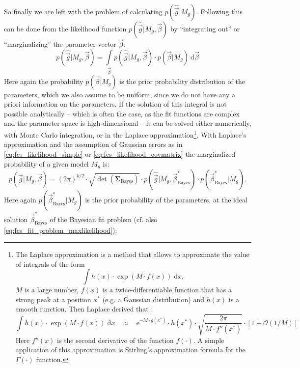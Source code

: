 \documentclass[a4paper,notitlepage]{article}
\newcommand{\mat}[1]{\mathrm{\mathbf{#1}}}
\begin{document}
So finally we are left with the problem of calculating $p(\hat{\vec{g}}|M_g)$. Following  \cite{HE2012} this can be done from the likelihood function $p(\hat{\vec{g}}|M_g,\vec{\beta})$ by ``integrating out'' or ``marginalizing'' the parameter vector $\vec{\beta}$:
\begin{equation}\label{eq:bayes_propfromlikelihood}
    p(\hat{\vec{g}}|M_g,\vec{\beta})=\int\limits_{\vec{\beta}} p(\hat{\vec{g}}|M_g,\vec{\beta})\cdot p(\vec{\beta}|M_g)\ \mathrm{d}\vec{\beta}
\end{equation}
Here again the probability $p(\vec{\beta}|M_g)$ is the prior probability distribution of the parameters, which we also assume to be uniform, since we do not have any a priori information on the parameters. If the solution of this integral is not possible analytically -- which is often the case, as the fit functions are complex and the parameter space is high-dimensional -- it can be solved either numerically, with Monte Carlo integration, or in the Laplace approximation\cite{KASS1995}\footnote{The Laplace approximation is a method that allows to approximate the value of integrals of the form \[\int h(x)\cdot \exp\left(M\cdot f(x)\right)\;\mathrm{d}x,\] $M$ is a large number, $f(x)$ is a twice-differentiable function that has a strong peak at a position $x^\ast$ (e.g. a Gaussian distribution) and $h(x)$ is a smooth function. Then Laplace derived that \cite{Lauritzen_laplace}:
\[\int h(x)\cdot \exp\left(M\cdot f(x)\right)\;\mathrm{d}x \ \ \ \ \approx\ \ \ \  \mathrm{e}^{-M\cdot g(x^\ast)}\cdot h(x^\ast)\cdot\sqrt{\frac{2\pi}{M\cdot f''(x^\ast)}}\cdot\left[1+\mathcal{O}(1/M)\right]\] Here $f''(x)$ is the second derivative of the function $f(\cdot)$. A simple application of this approximation is Stirling's approximation formula for the $\Gamma(\cdot)$ function. }.
With Laplace's approximation and the assumption of Gaussian errors as in \eqref{eq:fcs_likelihood_simple} or \eqref{eq:fcs_likelihood_covmatrix} the marginalized probability of a given model $M_g$ is:
\begin{equation}\label{eq:bayes_marginprob_laplace}
    p(\hat{\vec{g}}|M_g,\vec{\beta})=(2\pi)^{k/2}\cdot\sqrt{\det(\mat{\Sigma}_\text{Bayes})}\cdot p(\hat{\vec{g}}|M_g,\vec{\beta}^\ast_\text{Bayes})\cdot p(\vec{\beta}^\ast_\text{Bayes}|M_g).
\end{equation}
Here again $p(\vec{\beta}^\ast_\text{Bayes}|M_g)$ is the prior probability of the parameters, at the ideal solution $\vec{\beta}^\ast_\text{Bayes}$ of the Bayesian fit problem (cf. also \eqref{eq:fcs_fit_problem_maxlikelihood}):
\end{document}
